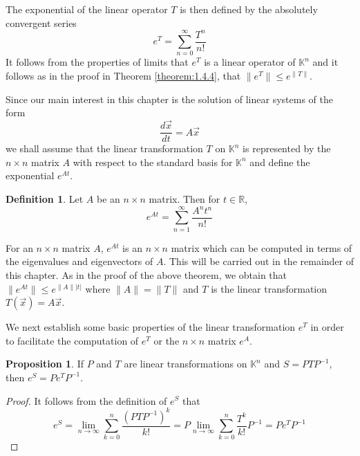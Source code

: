 \documentclass[11pt]{book}
\theoremstyle{definition}\newtheorem{definition}[subsection]{Definition}
\theoremstyle{definition}\newtheorem{example}[subsection]{Example}
\theoremstyle{definition}\newtheorem{notation}[subsection]{Notation}
\theoremstyle{definition}\newtheorem{remark}[subsection]{Remark}
\theoremstyle{theorem}\newtheorem{theorem}[subsection]{Theorem}
\theoremstyle{theorem}\newtheorem{lemma}[subsection]{Lemma}
\theoremstyle{theorem}\newtheorem{proposition}[subsection]{Proposition}
\theoremstyle{theorem}\newtheorem{corollary}[subsection]{Corollary}
\theoremstyle{theorem}\newtheorem{case}{Case}
\theoremstyle{remark}\newtheorem{subcase}{Subcase}[case]
\newcommand{\K}{\mathbb{K}}
\newcommand{\R}{\mathbb{R}}
\begin{document}
The exponential of the linear operator $T$ is then defined by the absolutely convergent series
\begin{equation*}
    e^T = \sum_{n = 0}^{\infty} \frac{T^n}{n!}
\end{equation*}
It follows from the properties of limits that $e^T$ is a linear operator of $\K^n$ and it follows as in the proof in Theorem \ref{theorem:1.4.4}, that $\|e^T\| \leq e^{\|T\|}$.

Since our main interest in this chapter is the solution of linear systems of the form
\begin{equation*}
    \frac{d\vec{x}}{dt} = A\vec{x}
\end{equation*}
we shall assume that the linear transformation $T$ on $\K^n$ is represented by the $n \times n$ matrix $A$ with respect to the standard basis for $\K^n$ and define the exponential $e^{At}$.

\begin{definition}\label{definition:1.4.5}
    Let $A$ be an $n \times n$ matrix. Then for $t \in \R$,
    \begin{equation*}
        e^{At} = \sum_{n = 1}^{\infty} \frac{A^n t^n}{n!}
    \end{equation*}
\end{definition}

For an $n \times n$ matrix $A$, $e^{At}$ is an $n \times n$ matrix which can be computed in terms of the eigenvalues and eigenvectors of $A$. This will be carried out in the remainder of this chapter. As in the proof of the above theorem, we obtain that $\|e^{At}\| \leq e^{\|A\||t|}$ where $\|A\| = \|T\|$ and $T$ is the linear transformation $T(\vec{x}) = A\vec{x}$.

We next establish some basic properties of the linear transformation $e^T$ in order to facilitate the computation of $e^T$ or the $n \times n$ matrix $e^A$.

\begin{proposition}\label{proposition:1.4.6}
    If $P$ and $T$ are linear transformations on $\K^n$ and $S = PTP^{-1}$, then $e^S = Pe^TP^{-1}$.
\end{proposition}

\begin{proof}
    It follows from the definition of $e^S$ that
    \begin{equation*}
        e^S = \lim_{n \to \infty} \sum_{k = 0}^{n} \frac{(PTP^{-1})^k}{k!} = P\lim_{n \to \infty} \sum_{k = 0}^{n} \frac{T^k}{k!}P^{-1} = Pe^TP^{-1}
    \end{equation*}
\end{proof}
\end{document}
